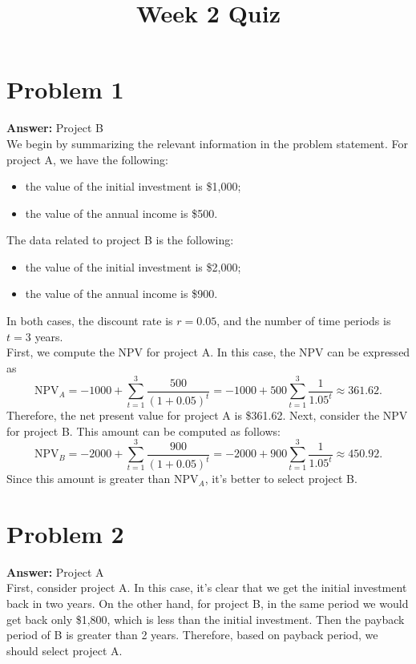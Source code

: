 \documentclass[11pt]{article}
\date{}
\title{Week 2 Quiz}
\begin{document}
\thispagestyle{empty}
\pagestyle{empty}
\section*{Problem 1}
\label{sec:orgcd3bf99}

\textbf{Answer:} Project B\\

We begin by summarizing the relevant information in the problem statement. For
project A, we have the following:
\begin{itemize}
\item the value of the initial investment is \$1,000;
\item the value of the annual income is \$500.
\end{itemize}
The data related to project B is the following:
\begin{itemize}
\item the value of the initial investment is \$2,000;
\item the value of the annual income is \$900.
\end{itemize}
In both cases, the discount rate is \(r=0.05\), and the number of time periods
is \(t=3\) years.\\
First, we compute the NPV for project A. In this case, the NPV can be expressed as
\begin{equation}
\mathrm{NPV}_A=-1000+\sum_{t=1}^3\frac{500}{(1+0.05)^t}=-1000+500\sum_{t=1}^3\frac{1}{1.05^t}\approx 361.62.
\end{equation}
Therefore, the net present value for project A is \$361.62. Next, consider the
NPV for project B. This amount can be computed as follows:
\begin{equation}
\mathrm{NPV}_B=-2000+\sum_{t=1}^3\frac{900}{(1+0.05)^t}=-2000+900\sum_{t=1}^3\frac{1}{1.05^t}\approx 450.92.
\end{equation}
Since this amount is greater than \(\mathrm{NPV}_A\), it's better to select
project B.
\section*{Problem 2}
\label{sec:org3f65365}

\textbf{Answer:} Project A\\

First, consider project A. In this case, it's clear that we get the initial
investment back in two years. On the other hand, for project B, in the same
period we would get back only \$1,800, which is less than the initial investment.
Then the payback period of B is greater than 2 years. Therefore, based on
payback period, we should select project A.
\end{document}
